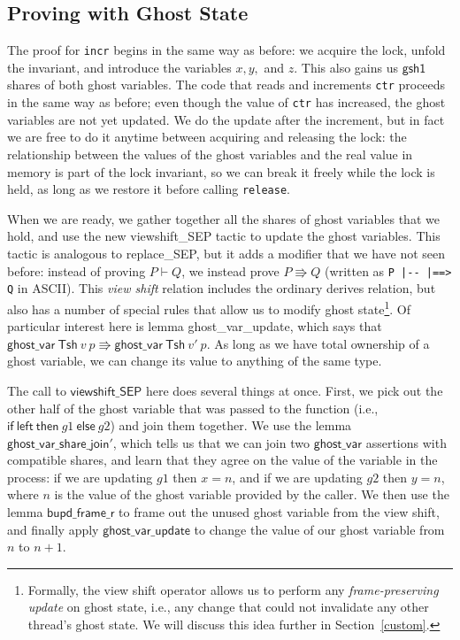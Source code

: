 \documentclass[11pt]{article}
\begin{document}
\subsection{Proving with Ghost State}
The proof for \texttt{incr} begins in the same way as before: we acquire the lock, unfold the invariant, and introduce the variables $x, y,$ and $z$. This also gains us $\mathsf{gsh1}$ shares of both ghost variables. The code that reads and increments \texttt{ctr} proceeds in the same way as before; even though the value of \texttt{ctr} has increased, the ghost variables are not yet updated. We do the update after the increment, but in fact we are free to do it anytime between acquiring and releasing the lock: the relationship between the values of the ghost variables and the real value in memory is part of the lock invariant, so we can break it freely while the lock is held, as long as we restore it before calling \texttt{release}.

When we are ready, we gather together all the shares of ghost variables that we hold, and use the new \textsf{viewshift\_SEP} tactic to update the ghost variables. This tactic is analogous to \textsf{replace\_SEP}, but it adds a modifier that we have not seen before: instead of proving $P \vdash Q$, we instead prove $P \Rrightarrow Q$ (written as \verb+P |-- |==> Q+ in ASCII). This \emph{view shift} relation includes the ordinary derives relation, but also has a number of special rules that allow us to modify ghost state\footnote{Formally, the view shift operator allows us to perform any \emph{frame-preserving update} on ghost state, i.e., any change that could not invalidate any other thread's ghost state. We will discuss this idea further in Section~\ref{custom}.}. Of particular interest here is lemma \textsf{ghost\_var\_update}, which says that $\mathsf{ghost\_var}\ \mathsf{Tsh}\ v\ p \Rrightarrow \mathsf{ghost\_var}\ \mathsf{Tsh}\ v'\ p$. As long as we have total ownership of a ghost variable, we can change its value to anything of the same type.

The call to $\mathsf{viewshift\_SEP}$ here does several things at once. First, we pick out the other half of the ghost variable that was passed to the function (i.e., $\mathsf{if\ left\ then\ }g1\mathsf{\ else\ }g2$) and join them together. We use the lemma $\mathsf{ghost\_var\_share\_join'}$, which tells us that we can join two $\mathsf{ghost\_var}$ assertions with compatible shares, and learn that they agree on the value of the variable in the process: if we are updating $g1$ then $x = n$, and if we are updating $g2$ then $y = n$, where $n$ is the value of the ghost variable provided by the caller. We then use the lemma $\mathsf{bupd\_frame\_r}$ to frame out the unused ghost variable from the view shift, and finally apply $\mathsf{ghost\_var\_update}$ to change the value of our ghost variable from $n$ to $n + 1$.
\end{document}
